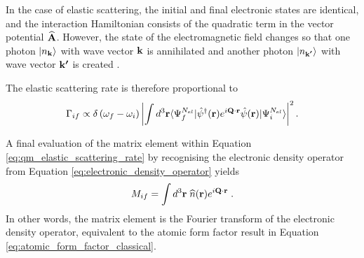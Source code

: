 In the case of elastic scattering, the initial and final electronic states are identical, and the interaction Hamiltonian consists of the quadratic term in the vector potential $\bm{\mathrm{\widehat{A}}}$.
However, the state of the electromagnetic field changes so that one photon $\vert n_{\bm{\mathrm{k}}}\rangle$ with wave vector $\bm{\mathrm{k}}$ is annihilated and another photon $\vert n_{\bm{\mathrm{k'}}}\rangle$ with wave vector $\bm{\mathrm{k'}}$ is created \cite{mcmorrow2011elements}.

The elastic scattering rate is therefore proportional to
\begin{equation}\label{eq:qm_elastic_scattering_rate}
    \Gamma_{if} \propto \delta \left( \omega_{f} - \omega_{i} \right) \left| \int d^{3}\bm{\mathrm{r}} \langle  \Psi_{f}^{N_{el}} | \hat{\psi}^{\dagger}(\bm{\mathrm{r}}) e^{i \bm{\mathrm{Q}} \cdot \bm{\mathrm{r}} } \hat{\psi}( \bm{\mathrm{r}})  | \Psi_{i}^{N_{el}} \rangle \right|^{2}.
\end{equation}

A final evaluation of the matrix element within Equation \eqref{eq:qm_elastic_scattering_rate} by recognising the electronic density operator from Equation \eqref{eq:electronic_density_operator} yields
\begin{equation}
    M_{if} = \int d^{3}\bm{\mathrm{r}} \left. \widehat{n}(\bm{\mathrm{r}}) e^{i \bm{\mathrm{Q}} \cdot \bm{\mathrm{r}}} \right. .
\end{equation}
In other words, the matrix element is the Fourier transform of the electronic density operator, equivalent to the atomic form factor result in Equation \eqref{eq:atomic_form_factor_classical}.



